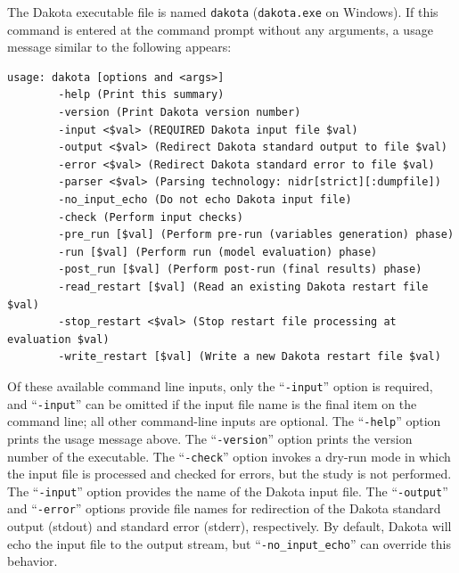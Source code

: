 The Dakota executable file is named {\tt dakota} ({\tt dakota.exe} on
Windows). If this command is entered at the command prompt without any
arguments, a usage message similar to the following appears:
\begin{small}
\begin{verbatim}
usage: dakota [options and <args>]
        -help (Print this summary)
        -version (Print Dakota version number)
        -input <$val> (REQUIRED Dakota input file $val)
        -output <$val> (Redirect Dakota standard output to file $val)
        -error <$val> (Redirect Dakota standard error to file $val)
        -parser <$val> (Parsing technology: nidr[strict][:dumpfile])
        -no_input_echo (Do not echo Dakota input file)
        -check (Perform input checks)
        -pre_run [$val] (Perform pre-run (variables generation) phase)
        -run [$val] (Perform run (model evaluation) phase)
        -post_run [$val] (Perform post-run (final results) phase)
        -read_restart [$val] (Read an existing Dakota restart file $val)
        -stop_restart <$val> (Stop restart file processing at evaluation $val)
        -write_restart [$val] (Write a new Dakota restart file $val)
\end{verbatim}
\end{small}

Of these available command line inputs, only the ``\texttt{-input}''
option is required, and ``\texttt{-input}'' can be omitted if the
input file name is the final item on the command line; all other
command-line inputs are optional. The ``\texttt{-help}'' option prints
the usage message above. The ``\texttt{-version}'' option prints the
version number of the executable. The ``\texttt{-check}'' option
invokes a dry-run mode in which the input file is processed and
checked for errors, but the study is not performed. The
``\texttt{-input}'' option provides the name of the Dakota input file.
The ``\texttt{-output}'' and ``\texttt{-error}'' options provide file
names for redirection of the Dakota standard output (stdout) and
standard error (stderr), respectively. By default, Dakota will echo
the input file to the output stream, but ``\texttt{-no\_input\_echo}''
can override this behavior.

